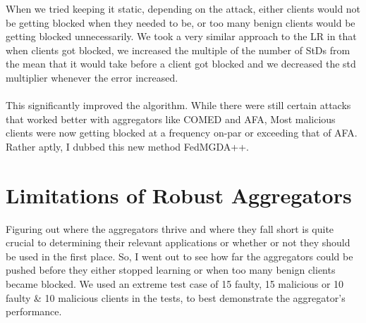When we tried keeping it static, depending on the attack, either clients would not be getting blocked when they needed to be, or too many benign clients would be getting blocked unnecessarily. 
We took a very similar approach to the LR in that when clients got blocked, we increased the multiple of the number of StDs from the mean that it would take before a client got blocked and we decreased the std multiplier whenever the error increased.
\\ \\
This significantly improved the algorithm. While there were still certain attacks that worked better with aggregators like COMED and AFA, Most malicious clients were now getting blocked at a frequency on-par or exceeding that of AFA.
Rather aptly, I dubbed this new method FedMGDA++.

\section{Limitations of Robust Aggregators}
Figuring out where the aggregators thrive and where they fall short is quite crucial to determining their relevant applications or whether or not they should be used in the first place.
So, I went out to see how far the aggregators could be pushed before they either stopped learning or when too many benign clients became blocked.
We used an extreme test case of 15 faulty, 15 malicious or 10 faulty \& 10 malicious clients in the tests, to best demonstrate the aggregator's performance.


